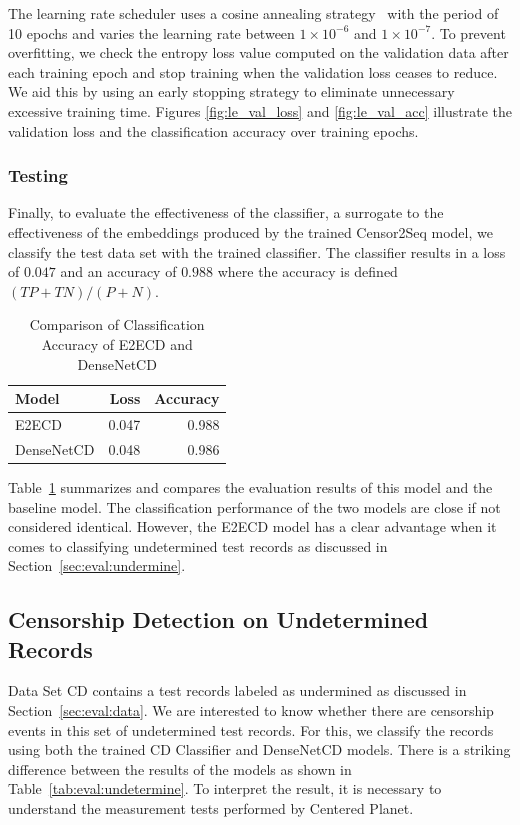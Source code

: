 The learning rate scheduler uses a cosine annealing
strategy~\cite{loshchilov10sgdr} with the period of 10 epochs and varies the
learning rate between $1 \times 10^{-6}$ and $1 \times 10^{-7}$.  To prevent
overfitting, we check the entropy loss value computed on the validation data
after each training epoch and stop training when the validation loss ceases to
reduce. We aid this by using an early stopping strategy to eliminate
unnecessary excessive training time.  Figures \ref{fig:le_val_loss} and
\ref{fig:le_val_acc} illustrate the validation loss and the classification
accuracy over training epochs.  


\subsubsection{Testing}
Finally, to evaluate the effectiveness of the classifier, a surrogate to the
effectiveness of the embeddings produced by the trained Censor2Seq model, we
classify the test data set with the trained classifier. The classifier results
in a loss of $0.047$ and an accuracy of $0.988$ where the accuracy is
defined $(TP + TN)/(P + N)$. 


\begin{table}[!htbp]
	\centering
	\caption{Comparison of Classification Accuracy of E2ECD and DenseNetCD}
	\label{tab:eval:compare}
	\begin{tabular}{p{} r r}
		\toprule
		Model & Loss & Accuracy \\
		\midrule
		E2ECD& 0.047 & 0.988 \\
		DenseNetCD & 0.048 & 0.986 \\
		\bottomrule
	\end{tabular}
\end{table}

Table~\ref{tab:eval:compare} summarizes and compares the evaluation results of
this model and the baseline model. The classification performance of the two
models are close if not considered identical. However, the E2ECD
model has a clear advantage when it comes to classifying
undetermined test records as discussed in Section~\ref{sec:eval:undermine}.

\subsection{Censorship Detection on Undetermined Records}\label{sec:results}
\label{sec:eval:undermine}

Data Set CD contains a \CDnunknown test records labeled as undermined as discussed
in Section~\ref{sec:eval:data}. 
We are interested to know whether there are censorship
events in this set of undetermined test records. For this, we classify the
records using both the trained CD Classifier and
DenseNetCD models. There is a striking difference between the results
of the models as shown in Table~\ref{tab:eval:undetermine}. To interpret the 
result, it is necessary to understand the measurement tests performed by 
Centered Planet. 

